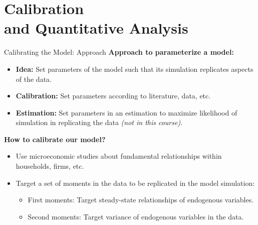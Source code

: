 \documentclass[10pt,c,aspectratio=1610,handout]{beamer}
\begin{document}
\section{Calibration\\and Quantitative Analysis}%
\begin{frame}{Calibrating the Model: Approach}%
  \textbf{Approach to parameterize a model:}%
  \begin{itemize}%
    \item[$\blacktriangleright$] \textbf{Idea:} Set parameters of the model such that its simulation replicates aspects of the data.%
    \item[$\blacktriangleright$] \textbf{Calibration:} Set parameters according to literature, data, etc.%
    \item[$\blacktriangleright$] \textbf{Estimation:} Set parameters in an estimation to maximize likelihood of simulation in replicating the data \emph{(not in this course)}.%
  \end{itemize}%
  \pause%
  \vspace*{0.1in}%
  \textbf{How to calibrate our model?}%
  \begin{itemize}%
    \item[$\blacktriangleright$] Use microeconomic studies about fundamental relationships within households, firms, etc.%
    \item[$\blacktriangleright$] Target a set of moments in the data to be replicated in the model simulation:%
    \begin{itemize}%
      \item[$\rightarrow$] First moments: Target steady-state relationships of endogenous variables.%
      \item[$\rightarrow$] Second moments: Target variance of endogenous variables in the data.%
    \end{itemize}%
  \end{itemize}%
\end{frame}%
\end{document}
